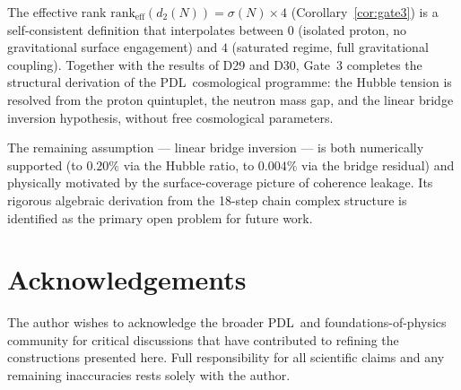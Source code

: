 \documentclass[11pt,a4paper]{article}
\theoremstyle{definition}
\newcommand{\PDL}{\textnormal{PDL}}
\newcommand{\sig}{\sigma}
\newcommand{\dmap}{d_2}
\begin{document}
The effective rank $\mathrm{rank}_{\mathrm{eff}}(\dmap(N)) = \sig(N)\times 4$ (Corollary~\ref{cor:gate3}) is a self-consistent definition that interpolates between $0$ (isolated proton, no gravitational surface engagement) and $4$ (saturated regime, full gravitational coupling). Together with the results of D29 and D30, Gate~3 completes the structural derivation of the \PDL\ cosmological programme: the Hubble tension is resolved from the proton quintuplet, the neutron mass gap, and the linear bridge inversion hypothesis, without free cosmological parameters.

The remaining assumption --- linear bridge inversion --- is both numerically supported (to $0.20\%$ via the Hubble ratio, to $0.004\%$ via the bridge residual) and physically motivated by the surface-coverage picture of coherence leakage. Its rigorous algebraic derivation from the 18-step chain complex structure is identified as the primary open problem for future work.

\section*{Acknowledgements}

The author wishes to acknowledge the broader \PDL\ and foundations-of-physics community for critical discussions that have contributed to refining the constructions presented here. Full responsibility for all scientific claims and any remaining inaccuracies rests solely with the author.



\end{document}
